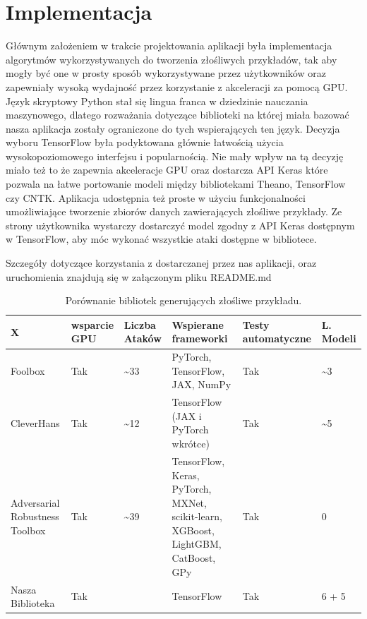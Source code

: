 \documentclass[
    left=2.5cm,         %
    right=2.5cm,        %
    top=2.5cm,          %
    bottom=3cm,         %
    bindingoffset=6mm,  %
    nohyphenation=false %
]{eiti/eiti-thesis}
\begin{document}
\section{Implementacja}
Głównym założeniem w trakcie projektowania aplikacji była implementacja algorytmów wykorzystywanych do
tworzenia złośliwych przykładów, tak aby mogły być one w prosty sposób wykorzystywane przez użytkowników oraz zapewniały
wysoką wydajność przez korzystanie z akceleracji za pomocą GPU.
Język skryptowy Python stał się lingua franca w dziedzinie nauczania maszynowego,
dlatego rozważania dotyczące biblioteki na której miała bazować nasza aplikacja zostały ograniczone do tych wspierających ten język.
Decyzja wyboru TensorFlow była podyktowana głównie łatwością użycia wysokopoziomowego interfejsu i popularnością. Nie mały wpływ na tą decyzję miało też to że
zapewnia akceleracje GPU oraz dostarcza API Keras które pozwala na łatwe portowanie modeli między bibliotekami Theano\cite{2016arXiv160502688short}, TensorFlow\cite{DBLP:journals/corr/AbadiABBCCCDDDG16} czy CNTK\cite{cntk}.
Aplikacja udostępnia też proste w użyciu funkcjonalności umożliwiające tworzenie zbiorów danych zawierających złośliwe przykłady.
Ze strony użytkownika wystarczy dostarczyć model zgodny z API Keras dostępnym w TensorFlow, aby móc wykonać wszystkie ataki
dostępne w bibliotece.

Szczegóły dotyczące korzystania z dostarczanej przez nas aplikacji, oraz uruchomienia znajdują się w załączonym pliku README.md

\begin{center}
    \begin{table}[ht]

    \caption{Porównanie bibliotek generujących złośliwe przykładu.}
    \begin{tabular}{|>{\centering}p{2.5cm}|>{\centering}p{2.0cm}|>{\centering}p{2.0cm}|p{5.0cm}|p{1.0cm}|p{1.0cm}|}
        \hline
        X & wsparcie GPU & Liczba Ataków & Wspierane frameworki & Testy automatyczne & L. Modeli\\
        \hline
        Foolbox & Tak\footnotemark[1] & \textasciitilde33 & PyTorch, TensorFlow, JAX, NumPy & Tak & \textasciitilde3\\
        \hline
        CleverHans & Tak\footnotemark[1] & \textasciitilde12 & TensorFlow (JAX i PyTorch wkrótce) & Tak & \textasciitilde5\\
        \hline
        Adversarial Robustness Toolbox & Tak\footnotemark[1] & \textasciitilde39 & TensorFlow, Keras, PyTorch, MXNet, scikit-learn, XGBoost, LightGBM, CatBoost, GPy  & Tak & 0\\
        \hline
        Nasza Biblioteka & Tak & 6 & TensorFlow & Tak & 6 + 5\footnotemark[2] \\
        \hline
    \end{tabular}
    \label{tab:frameworks_comparison}
    \end{table}
\end{center}
\end{document}
